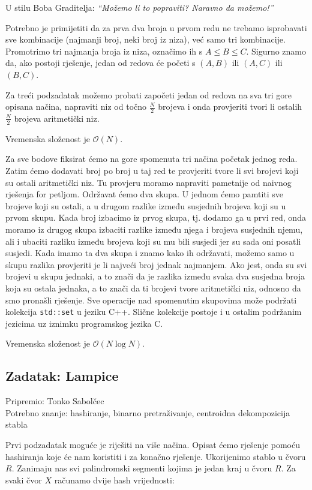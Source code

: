 \documentclass[a4paper]{article}
\begin{document}
U stilu Boba Graditelja: \emph{“Možemo li to popraviti? Naravno da možemo!”}

Potrebno je primijetiti da za prva dva broja u prvom redu ne trebamo isprobavati
sve kombinacije (najmanji broj, neki broj iz niza), već samo tri kombinacije.
Promotrimo tri najmanja broja iz niza, označimo ih s $A \le B \le C$. Sigurno
znamo da, ako postoji rješenje, jedan od redova će početi s $(A, B)$ ili $(A, C)$
ili $(B, C)$.

Za treći podzadatak možemo probati započeti jedan od redova na sva tri gore
opisana načina, napraviti niz od točno $\frac{N}{2}$ brojeva i onda provjeriti
tvori li ostalih $\frac{N}{2}$ brojeva aritmetički niz.

Vremenska složenost je $\mathcal{O}(N)$.

Za sve bodove fiksirat ćemo na gore spomenuta tri načina početak jednog reda.
Zatim ćemo dodavati broj po broj u taj red te provjeriti tvore li svi brojevi
koji su ostali aritmetički niz. Tu provjeru moramo napraviti pametnije od
naivnog rješenja for petljom. Održavat ćemo dva skupa. U jednom ćemo pamtiti sve
brojeve koji su ostali, a u drugom razlike između susjednih brojeva koji su u
prvom skupu. Kada broj izbacimo iz prvog skupa, tj. dodamo ga u prvi red, onda
moramo iz drugog skupa izbaciti razlike između njega i brojeva susjednih njemu,
ali i ubaciti razliku između brojeva koji su mu bili susjedi jer su sada oni
posatli susjedi. Kada imamo ta dva skupa i znamo kako ih održavati, možemo samo
u skupu razlika provjeriti je li najveći broj jednak najmanjem. Ako jest, onda
su svi brojevi u skupu jednaki, a to znači da je razlika između svaka dva
susjedna broja koja su ostala jednaka, a to znači da ti brojevi tvore
aritmetički niz, odnosno da smo pronašli rješenje. Sve operacije nad
spomenutim skupovima može podržati kolekcija \texttt{std::set} u jeziku
C++. Slične kolekcije postoje i u ostalim podržanim jezicima uz iznimku
programskog jezika C.

Vremenska složenost je $\mathcal{O}(N \log N)$.

\subsection*{Zadatak: Lampice}
\textsf{Pripremio: Tonko Sabolčec}\\
\textsf{Potrebno znanje: hashiranje, binarno pretraživanje, centroidna
dekompozicija stabla}

Prvi podzadatak moguće je riješiti na više načina. Opisat ćemo rješenje pomoću
hashiranja koje će nam koristiti i za konačno rješenje. Ukorijenimo stablo u
čvoru $R$. Zanimaju nas svi palindromski segmenti kojima je jedan kraj u čvoru
$R$.
Za svaki čvor $X$ računamo dvije hash vrijednosti:
\end{document}
